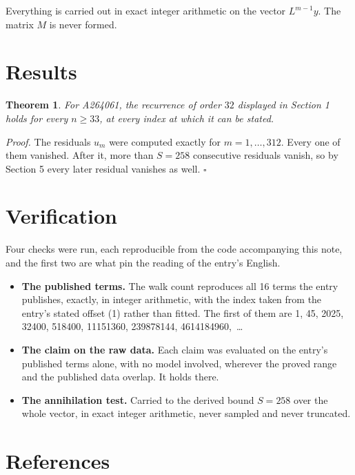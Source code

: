 \documentclass[11pt]{article}
\newtheorem{theorem}{Theorem}
\theoremstyle{definition}
\begin{document}
Everything is carried out in exact integer arithmetic on the vector $L^{m-1}y$. The matrix $M$ is never formed.

\section{Results}

\begin{theorem} For A264061, the recurrence of order $32$ displayed in Section 1 holds for every $n \ge 33$, at every index at which it can be stated.\end{theorem}

{\itshape Proof.} The residuals $u_m$ were computed exactly for $m = 1,\dots,312$. Every one of them vanished. After it, more than $S = 258$ consecutive residuals vanish, so by Section 5 every later residual vanishes as well. $\square$

\section{Verification}

Four checks were run, each reproducible from the code accompanying this note, and the first two are what pin the reading of the entry's English.

\begin{itemize}

\item {\bfseries The published terms.} The walk count reproduces all 16 terms the entry publishes, exactly, in integer arithmetic, with the index taken from the entry's stated offset (1) rather than fitted. The first of them are 1, 45, 2025, 32400, 518400, 11151360, 239878144, 4614184960,~\dots

\item {\bfseries The claim on the raw data.} Each claim was evaluated on the entry's published terms alone, with no model involved, wherever the proved range and the published data overlap. It holds there.

\item {\bfseries The annihilation test.} Carried to the derived bound $S = 258$ over the whole vector, in exact integer arithmetic, never sampled and never truncated.

\end{itemize}

\section{References}
\end{document}
